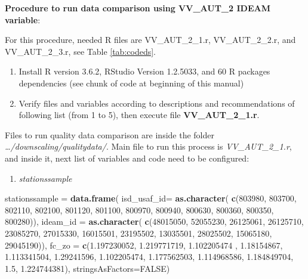 \documentclass[12pt,twoside]{reedthesis}
\newenvironment{Shaded}{\begin{snugshade}}{\end{snugshade}}
\newcommand{\DataTypeTok}[1]{\textcolor[rgb]{0.13,0.29,0.53}{#1}}
\newcommand{\DecValTok}[1]{\textcolor[rgb]{0.00,0.00,0.81}{#1}}
\newcommand{\FloatTok}[1]{\textcolor[rgb]{0.00,0.00,0.81}{#1}}
\newcommand{\KeywordTok}[1]{\textcolor[rgb]{0.13,0.29,0.53}{\textbf{#1}}}
\newcommand{\NormalTok}[1]{#1}
\newcommand{\OtherTok}[1]{\textcolor[rgb]{0.56,0.35,0.01}{#1}}
\newcommand{\StringTok}[1]{\textcolor[rgb]{0.31,0.60,0.02}{#1}}
\providecommand{\tightlist}{%
  \setlength{\itemsep}{0pt}\setlength{\parskip}{0pt}}
\begin{document}
\textbf{Procedure to run data comparison using VV\_AUT\_2 IDEAM variable}:

For this procedure, needed R files are VV\_AUT\_2\_1.r, VV\_AUT\_2\_2.r, and VV\_AUT\_2\_3.r, see Table \ref{tab:codeds}.
\begin{enumerate}
\def\labelenumi{\arabic{enumi}.}
\item
  Install R version 3.6.2, RStudio Version 1.2.5033, and 60 R packages dependencies (see chunk of code at beginning of this manual)
\item
  Verify files and variables according to descriptions and recommendations of following list (from 1 to 5), then execute file \textbf{VV\_AUT\_2\_1.r}.
\end{enumerate}
Files to run quality data comparison are inside the folder \emph{\ldots/downscaling/qualitydata/}. Main file to run this process is \emph{VV\_AUT\_2\_1.r}, and inside it, next list of variables and code need to be configured:
\begin{enumerate}
\def\labelenumi{\arabic{enumi}.}
\tightlist
\item
  \emph{stationssample}
\end{enumerate}
\scriptsize

\vspace{0.4cm}
\begin{Shaded}
\begin{Highlighting}[]
\NormalTok{    stationssample =}\StringTok{ }\KeywordTok{data.frame}\NormalTok{(}
      \DataTypeTok{isd_usaf_id=} \KeywordTok{as.character}\NormalTok{(}
        \KeywordTok{c}\NormalTok{(}\DecValTok{803980}\NormalTok{, }\DecValTok{803700}\NormalTok{, }\DecValTok{802110}\NormalTok{, }\DecValTok{802100}\NormalTok{, }\DecValTok{801120}\NormalTok{, }\DecValTok{801100}\NormalTok{, }
          \DecValTok{800970}\NormalTok{, }\DecValTok{800940}\NormalTok{, }\DecValTok{800630}\NormalTok{, }\DecValTok{800360}\NormalTok{, }\DecValTok{800350}\NormalTok{, }\DecValTok{800280}\NormalTok{)), }
      \DataTypeTok{ideam_id =} \KeywordTok{as.character}\NormalTok{(}
        \KeywordTok{c}\NormalTok{(}\DecValTok{48015050}\NormalTok{, }\DecValTok{52055230}\NormalTok{, }\DecValTok{26125061}\NormalTok{, }\DecValTok{26125710}\NormalTok{, }\DecValTok{23085270}\NormalTok{, }\DecValTok{27015330}\NormalTok{, }
          \DecValTok{16015501}\NormalTok{, }\DecValTok{23195502}\NormalTok{, }\DecValTok{13035501}\NormalTok{, }\DecValTok{28025502}\NormalTok{, }\DecValTok{15065180}\NormalTok{, }\DecValTok{29045190}\NormalTok{)),}
      \DataTypeTok{fc_zo =} 
        \KeywordTok{c}\NormalTok{(}\FloatTok{1.197230052}\NormalTok{, }\FloatTok{1.219771719}\NormalTok{, }\FloatTok{1.102205474}\NormalTok{ , }\FloatTok{1.18154867}\NormalTok{, }\FloatTok{1.113341504}\NormalTok{, }\FloatTok{1.29241596}\NormalTok{, }
          \FloatTok{1.102205474}\NormalTok{, }\FloatTok{1.177562503}\NormalTok{, }\FloatTok{1.114968586}\NormalTok{, }\FloatTok{1.184849704}\NormalTok{, }\FloatTok{1.5}\NormalTok{, }\FloatTok{1.224744381}\NormalTok{),  }
      \DataTypeTok{stringsAsFactors=}\OtherTok{FALSE}\NormalTok{)}
\end{Highlighting}
\end{Shaded}
\normalsize
\end{document}
